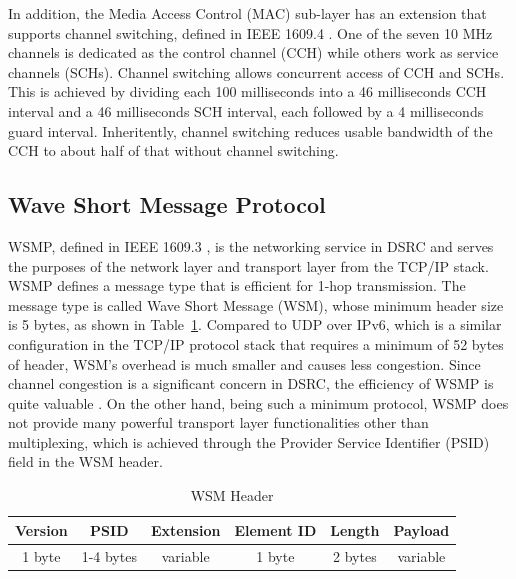 \documentclass[12pt]{report}
\begin{document}
In addition, the Media Access Control (MAC) sub-layer has an extension that supports channel switching, defined in IEEE 1609.4 \cite{ieee16094}. One of the seven 10 MHz channels is dedicated as the control channel (CCH) while others work as service channels (SCHs). Channel switching allows concurrent access of CCH and SCHs. This is achieved by dividing each 100 milliseconds into a 46 milliseconds CCH interval and a 46 milliseconds SCH interval, each followed by a 4 milliseconds guard interval. Inheritently, channel switching reduces usable bandwidth of the CCH to about half of that without channel switching.

\subsection{Wave Short Message Protocol}
WSMP, defined in IEEE 1609.3 \cite{ieee16093}, is the networking service in DSRC and serves the purposes of the network layer and transport layer from the TCP/IP stack. WSMP defines a message type that is efficient for 1-hop transmission. The message type is called Wave Short Message (WSM), whose minimum header size is 5 bytes, as shown in Table~\ref{tab:wsm}. Compared to UDP over IPv6, which is a similar configuration in the TCP/IP protocol stack that requires a minimum of 52 bytes of header, WSM's overhead is much smaller and causes less congestion. Since channel congestion is a significant concern in DSRC, the efficiency of WSMP is quite valuable \cite{kenney2011}. On the other hand, being such a minimum protocol, WSMP does not provide many powerful transport layer functionalities other than multiplexing, which is achieved through the Provider Service Identifier (PSID) field in the WSM header.

\begin{table}[h]
  \begin{center}
    \begin{tabular}{|c|c|c|c|c|c|}
      \hline
      Version & PSID      & Extension   & Element ID & Length  & Payload \\ \hline
      1 byte  & 1-4 bytes & variable    & 1 byte     & 2 bytes & variable \\ \hline
    \end{tabular}
    \caption{\label{tab:wsm}WSM Header}
  \end{center}
\end{table}
\end{document}
